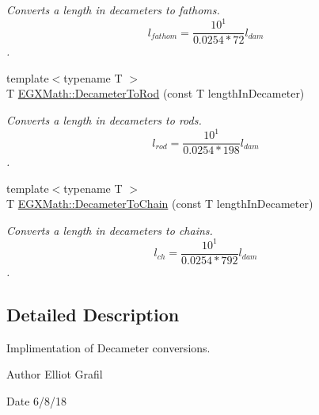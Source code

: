 \begin{DoxyCompactItemize}
\begin{DoxyCompactList}\small\item\em Converts a length in decameters to fathoms. \[ l_{fathom}= \frac{10^{1}}{0.0254 * 72} l_{dam} \]. \end{DoxyCompactList}\item 
{\footnotesize template$<$typename T $>$ }\\T \mbox{\hyperlink{group___e_g_x_math-_conversions-_length_conversions-_s_i-_decameter-_surveyors_ga0a6de708486617662fba474b67c8faa5}{E\+G\+X\+Math\+::\+Decameter\+To\+Rod}} (const T length\+In\+Decameter)
\begin{DoxyCompactList}\small\item\em Converts a length in decameters to rods. \[ l_{rod}= \frac{10^{1}}{0.0254 * 198} l_{dam} \]. \end{DoxyCompactList}\item 
{\footnotesize template$<$typename T $>$ }\\T \mbox{\hyperlink{group___e_g_x_math-_conversions-_length_conversions-_s_i-_decameter-_surveyors_ga7ede3a9605004deb5638075581637354}{E\+G\+X\+Math\+::\+Decameter\+To\+Chain}} (const T length\+In\+Decameter)
\begin{DoxyCompactList}\small\item\em Converts a length in decameters to chains. \[ l_{ch}= \frac{10^{1}}{0.0254 * 792} l_{dam} \]. \end{DoxyCompactList}\end{DoxyCompactItemize}


\subsection{Detailed Description}
Implimentation of Decameter conversions. 

\begin{DoxyAuthor}{Author}
Elliot Grafil 
\end{DoxyAuthor}
\begin{DoxyDate}{Date}
6/8/18 
\end{DoxyDate}

